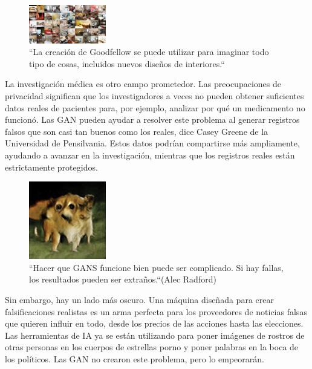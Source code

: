 \documentclass[a4paper]{article}
\begin{document}
\begin{figure} %
    \centering
     \includegraphics[width=0.3\textwidth]{./images/interiores.png}
	  \caption{``La creación de Goodfellow se puede utilizar para imaginar todo tipo de cosas, incluidos nuevos diseños de interiores.``}
\end{figure}




La investigación médica es otro campo prometedor. Las 
preocupaciones de privacidad significan que los investigadores a 
veces no pueden obtener suficientes datos reales de pacientes 
para, por ejemplo, analizar por qué un medicamento no funcionó. 
Las GAN pueden ayudar a resolver este problema al generar 
registros falsos que son casi tan buenos como los reales, dice 
Casey Greene de la Universidad de Pensilvania. Estos datos podrían 
compartirse más ampliamente, ayudando a avanzar en la 
investigación, mientras que los registros reales están 
estrictamente protegidos.
\begin{figure} %
    \centering
     \includegraphics[width=0.3\textwidth]{./images/rares_images.png}
	  \caption{``Hacer que GANS funcione bien puede ser complicado. Si hay fallas, los resultados pueden ser extraños.``(Alec Radford)}
\end{figure}
Sin embargo, hay un lado más oscuro. Una máquina diseñada para 
crear falsificaciones realistas es un arma perfecta para los 
proveedores de noticias falsas que quieren influir en todo, desde 
los precios de las acciones hasta las elecciones. Las herramientas 
de IA ya se están utilizando para poner imágenes de rostros de 
otras personas en los cuerpos de estrellas porno y poner palabras 
en la boca de los políticos. Las GAN no crearon este problema, 
pero lo empeorarán.
 
\end{document}
